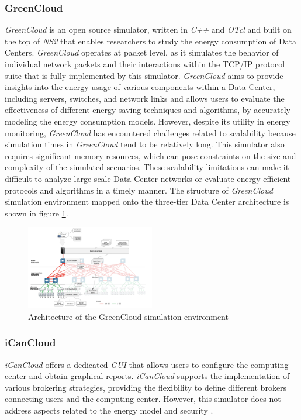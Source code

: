 {\subsubsection*{GreenCloud}
\emph{GreenCloud} \cite{kliazovich2012greencloud} is an open source simulator, written in \emph{C++} and \emph{OTcl} and built on the top of \emph{NS2} that enables researchers to study the energy consumption of Data Centers. \emph{GreenCloud} operates at packet level, as it simulates the behavior of individual network packets and their interactions within the TCP/IP protocol suite that is fully implemented by this simulator. \emph{GreenCloud} aims to provide insights into the energy usage of various components within a Data Center, including servers, switches, and network links and allows users to evaluate the effectiveness of different energy-saving techniques and algorithms, by accurately modeling the energy consumption models. However, despite its utility in energy monitoring, \emph{GreenCloud} has encountered challenges related to scalability because simulation times in \emph{GreenCloud} tend to be relatively long. This simulator also requires significant memory resources, which can pose constraints on the size and complexity of the simulated scenarios. These scalability limitations can make it difficult to analyze large-scale Data Center networks or evaluate energy-efficient protocols and algorithms in a timely manner. \cite{mansouri2020cloud}
The structure of \emph{GreenCloud} simulation environment mapped onto the three-tier Data Center architecture is shown in figure \ref{fig:greencloud_arch}. 
\begin{figure}[h]
    \centering
    \includegraphics[width=0.5\textwidth]{chapters/images/greencloud_arch.png}
    \caption{Architecture of the GreenCloud simulation environment}
    \label{fig:greencloud_arch}
\end{figure}
\subsubsection*{iCanCloud}
\emph{iCanCloud} \cite{nunez2012icancloud} offers a dedicated \emph{GUI} that allows users to configure the computing center and obtain graphical reports. \emph{iCanCloud} supports the implementation of various brokering strategies, providing the flexibility to define different brokers connecting users and the computing center. However, this simulator does not address aspects related to the energy model and security \cite{mansouri2020cloud}.
}
